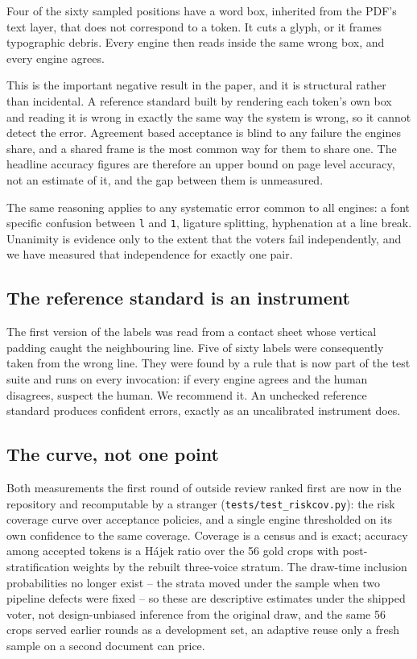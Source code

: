 \documentclass[11pt,a4paper]{article}
\begin{document}
Four of the sixty sampled positions have a word box, inherited from the PDF's text layer,
that does not correspond to a token. It cuts a glyph, or it frames typographic debris.
Every engine then reads inside the same wrong box, and every engine agrees.

This is the important negative result in the paper, and it is structural rather than
incidental. A reference standard built by rendering each token's own box and reading it
is wrong in exactly the same way the system is wrong, so it cannot detect the error.
Agreement based acceptance is blind to any failure the engines share, and a shared frame
is the most common way for them to share one. The headline accuracy figures are therefore
an upper bound on page level accuracy, not an estimate of it, and the gap between them is
unmeasured.

The same reasoning applies to any systematic error common to all engines: a font specific
confusion between \texttt{l} and \texttt{1}, ligature splitting, hyphenation at a line
break. Unanimity is evidence only to the extent that the voters fail independently, and
we have measured that independence for exactly one pair.

\subsection{The reference standard is an instrument}

The first version of the labels was read from a contact sheet whose vertical padding
caught the neighbouring line. Five of sixty labels were consequently taken from the wrong
line. They were found by a rule that is now part of the test suite and runs on every
invocation: if every engine agrees and the human disagrees, suspect the human. We
recommend it. An unchecked reference standard produces confident
errors, exactly as an uncalibrated instrument does.

\subsection{The curve, not one point}
\label{sec:riskcov}

Both measurements the first round of outside review ranked first are now in the
repository and recomputable by a stranger (\texttt{tests/test\_riskcov.py}): the risk
coverage curve over acceptance policies, and a single engine thresholded on its own
confidence to the same coverage. Coverage is a census and is exact; accuracy among
accepted tokens is a H\'ajek ratio over the 56 gold crops with post-stratification
weights by the rebuilt three-voice stratum. The draw-time inclusion probabilities no
longer exist -- the strata moved under the sample when two pipeline defects were fixed
-- so these are descriptive estimates under the shipped voter, not design-unbiased
inference from the original draw, and the same 56 crops served earlier rounds as a
development set, an adaptive reuse only a fresh sample on a second document can price.
\end{document}
